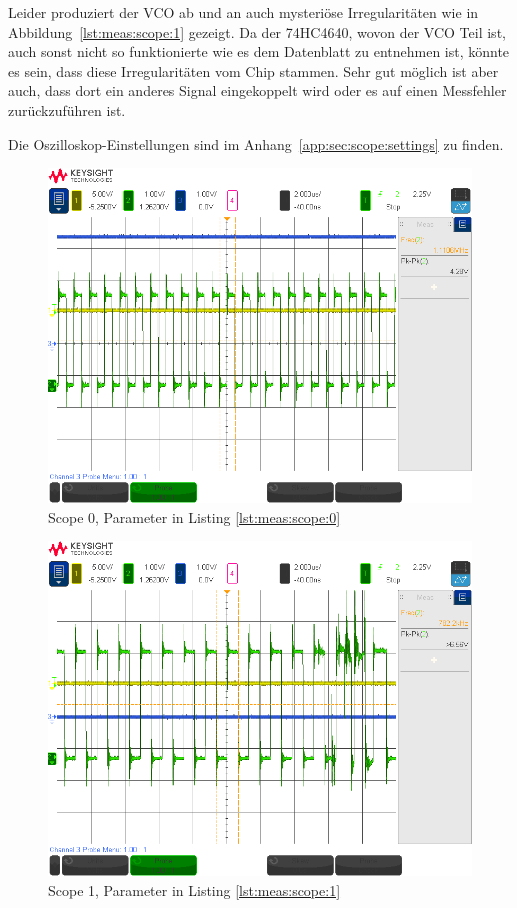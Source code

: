 Leider produziert der VCO ab und an auch mysteri\"ose Irregularit\"aten wie in
Abbildung~\ref{lst:meas:scope:1} gezeigt. Da der 74HC4640,  wovon der VCO Teil
ist, auch sonst nicht so funktionierte wie es dem Datenblatt zu entnehmen ist,
k\"onnte  es sein,  dass diese  Irregularit\"aten vom  Chip stammen. Sehr  gut
m\"oglich ist aber  auch, dass dort ein anderes Signal  eingekoppelt wird oder
es auf einen Messfehler zur\"uckzuf\"uhren ist.

Die Oszilloskop-Einstellungen  sind im  Anhang~\ref{app:sec:scope:settings} zu
finden.

\begin{figure}[h!tb]
    \centering
    \includegraphics[width=1\textwidth, trim=0mm 21mm 0mm 11mm, clip]{images/scopeShots/scope_0b.png}
    \caption{Scope 0, Parameter in Listing \ref{lst:meas:scope:0}}
    \label{fig:meas:scope:0}
\end{figure}

\begin{figure}[h!tb]
    \centering
    \includegraphics[width=1\textwidth, trim=0mm 21mm 0mm 11mm, clip]{images/scopeShots/scope_1b.png}
    \caption{Scope 1, Parameter in Listing \ref{lst:meas:scope:1}}
    \label{fig:meas:scope:1}
\end{figure}

